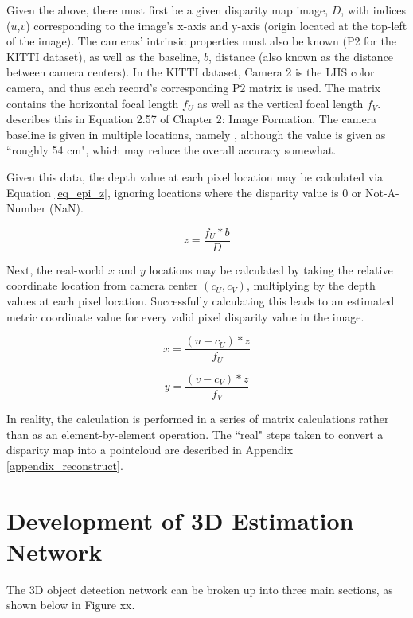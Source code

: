 Given the above, there must first be a given disparity map image, $D$, with indices ($u$,$v$) corresponding to the image's x-axis and y-axis (origin located at the top-left of the image). The cameras' intrinsic properties must also be known (P2 for the KITTI dataset), as well as the baseline, $b$, distance (also known as the distance between camera centers). In the KITTI dataset, Camera 2 is the LHS color camera, and thus each record's corresponding P2 matrix is used. The matrix contains the horizontal focal length $f_U$ as well as the vertical focal length $f_V$. \cite{szeliski_computer_2010} describes this in Equation 2.57 of Chapter 2: Image Formation. The camera baseline is given in multiple locations, namely \cite{geiger_are_2012}, although the value is given as ``roughly 54 cm", which may reduce the overall accuracy somewhat.

Given this data, the depth value at each pixel location may be calculated via Equation \ref{eq_epi_z}, ignoring locations where the disparity value is 0 or Not-A-Number (NaN).

\begin{equation}
z = \frac{f_U * b}{D}
\label{eq_epi_z}
\end{equation}

Next, the real-world $x$ and $y$ locations may be calculated by taking the relative coordinate location from camera center $(c_U,c_V)$, multiplying by the depth values at each pixel location. Successfully calculating this leads to an estimated metric coordinate value for every valid pixel disparity value in the image.

\begin{equation}
x = \frac{(u - c_U) * z}{f_U}
\end{equation}

\begin{equation}
y = \frac{(v - c_V) * z}{f_V}
\end{equation}

In reality, the calculation is performed in a series of matrix calculations rather than as an element-by-element operation. The ``real" steps taken to convert a disparity map into a pointcloud are described in Appendix \ref{appendix_reconstruct}.


\newpage
\section{Development of 3D Estimation Network}
The 3D object detection network can be broken up into three main sections, as shown below in Figure xx. 



